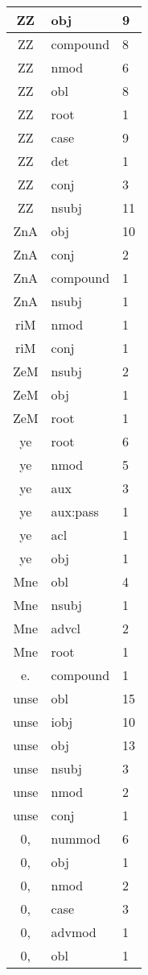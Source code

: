 \documentclass[a4 paper]{article}
\begin{document}
\begin{longtable}{cp{}p{}}
ZZ & obj & 9\\ \midrule ZZ & compound & 8\\ \midrule ZZ & nmod & 6\\ \midrule ZZ & obl & 8\\ \midrule ZZ & root & 1\\ \midrule ZZ & case & 9\\ \midrule ZZ & det & 1\\ \midrule ZZ & conj & 3\\ \midrule ZZ & nsubj & 11\\ \midrule 
ZnA & obj & 10\\ \midrule ZnA & conj & 2\\ \midrule ZnA & compound & 1\\ \midrule ZnA & nsubj & 1\\ \midrule 
riM & nmod & 1\\ \midrule riM & conj & 1\\ \midrule 
ZeM & nsubj & 2\\ \midrule ZeM & obj & 1\\ \midrule ZeM & root & 1\\ \midrule 
ye & root & 6\\ \midrule ye & nmod & 5\\ \midrule ye & aux & 3\\ \midrule ye & aux:pass & 1\\ \midrule ye & acl & 1\\ \midrule ye & obj & 1\\ \midrule 
Mne & obl & 4\\ \midrule Mne & nsubj & 1\\ \midrule Mne & advcl & 2\\ \midrule Mne & root & 1\\ \midrule 
e. & compound & 1\\ \midrule 
unse & obl & 15\\ \midrule unse & iobj & 10\\ \midrule unse & obj & 13\\ \midrule unse & nsubj & 3\\ \midrule unse & nmod & 2\\ \midrule unse & conj & 1\\ \midrule 
0, & nummod & 6\\ \midrule 0, & obj & 1\\ \midrule 0, & nmod & 2\\ \midrule 0, & case & 3\\ \midrule 0, & advmod & 1\\ \midrule 0, & obl & 1\\ \midrule 

\end{longtable}
\end{document}
